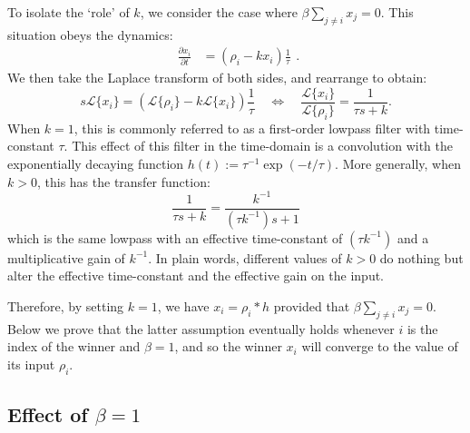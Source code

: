 \documentclass[a4paper]{article}
\begin{document}
To isolate the `role' of $k$, we consider the case where $\beta \sum_{j \ne i} x_j = 0$. 
This situation obeys the dynamics:
\begin{equation}
    \begin{split}
        \frac{{\partial x}_i}{\partial t} &= \left(\rho_i - kx_i\right) 
        \frac{1}{\tau}
    \end{split}.
\end{equation}
We then take the Laplace transform of both sides, and rearrange to obtain:
\begin{equation}
s\mathcal{L}\{x_i\} = \left( \mathcal{L}\{\rho_i\} - k\mathcal{L}\{x_i\} \right) \frac{1}{\tau} \quad \iff \quad \frac{\mathcal{L}\{x_i\}}{\mathcal{L}\{\rho_i\}} = \frac{1}{\tau s + k}.
\end{equation}
When $k = 1$, this is commonly referred to as a first-order lowpass filter with time-constant $\tau$.
This effect of this filter in the time-domain is a convolution with the exponentially decaying function $h(t) := \tau^{-1} \exp\left( -t / \tau \right)$.
More generally, when $k > 0$, this has the transfer function:
\begin{equation}
\frac{1}{\tau s + k} = \frac{k^{-1}}{(\tau k^{-1})s + 1}
\end{equation}
which is the same lowpass with an effective time-constant of $(\tau k^{-1})$ and a multiplicative gain of $k^{-1}$.
In plain words, different values of $k > 0$ do nothing but alter the effective time-constant and the effective gain on the input.

Therefore, by setting $k = 1$, we have $x_i = \rho_i \ast h$ provided that $\beta \sum_{j \ne i} x_j = 0$.
Below we prove that the latter assumption eventually holds whenever $i$ is the index of the winner and $\beta = 1$, and so the winner $x_i$ will converge to the value of its input $\rho_i$.

\newpage

\subsection{Effect of $\beta = 1$}
\end{document}
